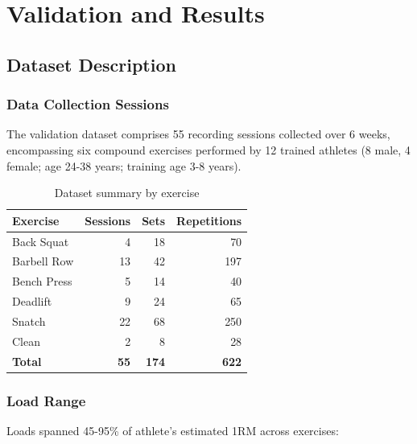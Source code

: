 
\chapter{Validation and Results} \label{chap:validation}

\section{Dataset Description}

\subsection{Data Collection Sessions}

The validation dataset comprises 55 recording sessions collected over 6 weeks, encompassing six compound exercises performed by 12 trained athletes (8 male, 4 female; age 24-38 years; training age 3-8 years).

\begin{table}[h]
    \centering
    \caption{Dataset summary by exercise}
    \label{tab:dataset_summary}
    \begin{tabular}{lrrr}
        \toprule
        \textbf{Exercise} & \textbf{Sessions} & \textbf{Sets} & \textbf{Repetitions} \\
        \midrule
        Back Squat & 4 & 18 & 70 \\
        Barbell Row & 13 & 42 & 197 \\
        Bench Press & 5 & 14 & 40 \\
        Deadlift & 9 & 24 & 65 \\
        Snatch & 22 & 68 & 250 \\
        Clean & 2 & 8 & 28 \\
        \midrule
        \textbf{Total} & \textbf{55} & \textbf{174} & \textbf{622} \\
        \bottomrule
    \end{tabular}
\end{table}

\subsection{Load Range}

Loads spanned 45-95\% of athlete's estimated 1RM across exercises:

